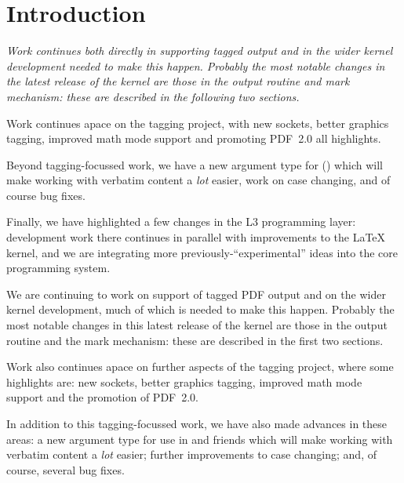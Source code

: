 \documentclass{ltnews}
\newenvironment{old}{\par\itshape}{\par}  %
\begin{document}
\maketitle
{  \spaceskip=3.33pt 
\tableofcontents}

\setlength{}

\medskip

\section{Introduction}

\begin{old}
Work continues both directly in supporting tagged output and in the wider
kernel development needed to make this happen. Probably the most notable
changes in the latest release of the kernel are those in the output routine
and mark mechanism: these are described in the following two sections.

Work continues apace on the tagging project, with new sockets, better
graphics tagging, improved math mode support and promoting PDF~2.0
all highlights.

Beyond tagging-focussed work, we have a new argument type for
 () which will make working with verbatim
content a \emph{lot} easier, work on case changing, and of
course bug fixes.

Finally, we have highlighted a few changes in the L3 programming layer:
development work there continues in parallel with improvements to the \LaTeX{}
kernel, and we are integrating more previously-\enquote{experimental} ideas
into the core programming system.
\end{old}


We are continuing to work on 
support of tagged PDF output and on the wider
kernel development, much of which is needed to make this happen. 
Probably the most notable
changes in this latest release of the kernel are those in the output routine
and the mark mechanism: these are described in the first two sections.

Work also continues apace on further aspects of the tagging project, 
where some highlights are: new sockets, better
graphics tagging, improved math mode support and the promotion of PDF~2.0.

In addition to this tagging-focussed work, we have also made advances in these areas:
 a new argument type for use in  and friends
which will make working with verbatim
content a \emph{lot} easier; further improvements to case changing; and, of
course,
several
bug fixes.
\end{document}
